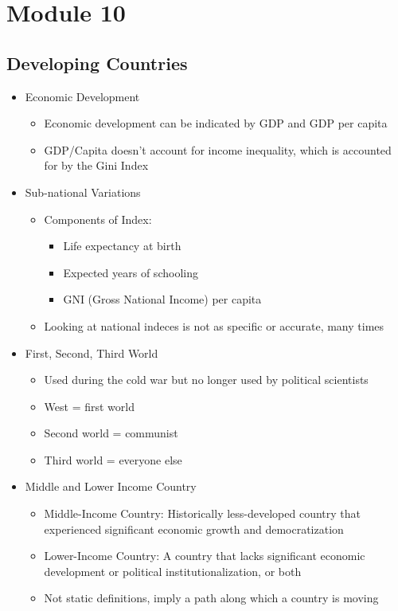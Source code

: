 \documentclass[11pt]{article}
\begin{document}
\section{Module 10}
\label{sec:org75300c6}
\subsection{Developing Countries}
\label{sec:orge52502d}
\begin{itemize}
\item Economic Development
\begin{itemize}
\item Economic development can be indicated by GDP and GDP per capita
\item GDP/Capita doesn't account for income inequality, which is accounted for by the Gini Index
\end{itemize}
\item Sub-national Variations
\begin{itemize}
\item Components of Index:
\begin{itemize}
\item Life expectancy at birth
\item Expected years of schooling
\item GNI (Gross National Income) per capita
\end{itemize}
\item Looking at national indeces is not as specific or accurate, many times
\end{itemize}
\item First, Second, Third World
\begin{itemize}
\item Used during the cold war but no longer used by political scientists
\item West = first world
\item Second world = communist
\item Third world = everyone else
\end{itemize}
\item Middle and Lower Income Country
\begin{itemize}
\item Middle-Income Country: Historically less-developed country that experienced significant economic growth and democratization
\item Lower-Income Country: A country that lacks significant economic development or political institutionalization, or both
\item Not static definitions, imply a path along which a country is moving

\end{itemize}
\end{itemize}
\end{document}
